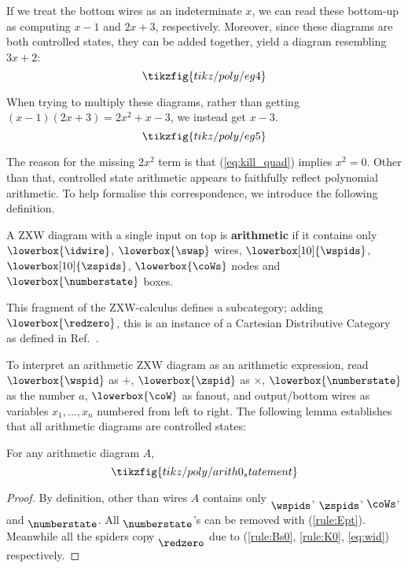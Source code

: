 If we treat the bottom wires as an indeterminate $x$, we can read these bottom-up as computing $x - 1$ and $2x + 3$, respectively. Moreover, since these diagrams are both controlled states, they can be added together,  yield a diagram resembling $3x + 2$:
\begin{equation*}
    \tikzfig{tikz/poly/eg4}
\end{equation*}

When trying to multiply these diagrams, rather than getting $(x-1)(2x+3) = 2x^2 + x - 3$, we instead get $x - 3$.
\begin{equation*}
    \tikzfig{tikz/poly/eg5}
\end{equation*}

The reason for the missing $2x^2$ term is that (\ref{eq:kill_quad}) implies $x^2 = 0$. Other than that, controlled state arithmetic appears to faithfully reflect polynomial arithmetic. To help formalise this correspondence, we introduce the following definition.

\begin{definition}
    A ZXW diagram with a single input on top is \textbf{arithmetic} if it contains only  $\lowerbox{\idwire}$, $\lowerbox{\swap}$ wires, $\lowerbox[10]{\wspids}$, $\lowerbox[10]{\zspids}$, $\lowerbox{\coWs}$ nodes and $\lowerbox{\numberstate}$ boxes.
\end{definition}
\begin{remark}
    This fragment of the ZXW-calculus defines a subcategory; adding $\lowerbox{\redzero}$, this is an instance of a Cartesian Distributive Category as defined in Ref.~\cite{wilson2023diffpolycirc}.
\end{remark}

To interpret an arithmetic ZXW diagram as an arithmetic expression, read $\lowerbox{\wspid}$ as $+$, $\lowerbox{\zspid}$ as $\times$, $\lowerbox{\numberstate}$ as the number $a$, $\lowerbox{\coW}$ as fanout, and output/bottom wires as variables $x_1, ..., x_n$ numbered from left to right. The following lemma establishes that all arithmetic diagrams are controlled states:
\begin{lemma}
    For any arithmetic diagram $A$, \begin{equation}\label{eq:arith_cs}
        \tikzfig{tikz/poly/arith0_statement}
    \end{equation}
\end{lemma}
\begin{proof}
    By definition, other than wires $A$ contains only $\raisebox{-7pt}{\wspids}$, $\raisebox{-7pt}{\zspids}$, $\raisebox{-5pt}{\coWs}$, and $\raisebox{-3pt}{\numberstate}$. All $\raisebox{-3pt}{\numberstate}$'s can be removed with (\ref{rule:Ept}). Meanwhile all the spiders copy $\raisebox{-5pt}{\redzero}$ due to (\ref{rule:Bs0}, \ref{rule:K0}, \ref{eq:wid}) respectively.
\end{proof}

